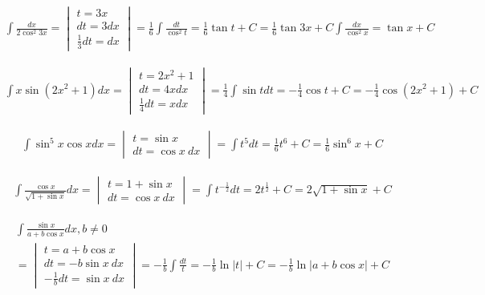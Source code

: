 
\begin{gather*}
  \int \frac{dx}{2\cos^2 3x} =
  \begin{vmatrix}
    t=3x \\
    dt=3dx \\
    \frac{1}{3}dt=dx
  \end{vmatrix}
  = \frac{1}{6} \int \frac{dt}{\cos^2 t}
  = \frac{1}{6} \tan t + C
  = \frac{1}{6}\tan 3x +C \int \frac{dx}{\cos^2x}
  = \tan x + C
\end{gather*}


\begin{gather*}
  \int x\sin(2x^2+1)dx =
  \begin{vmatrix}
    t=2x^2+1 \\
    dt=4xdx \\
    \frac{1}{4}dt=xdx
  \end{vmatrix}
  = \frac{1}{4}\int \sin{t} dt
  = -\frac{1}{4}\cos t + C
  = -\frac{1}{4}\cos (2x^2+1)+C
\end{gather*}


\begin{gather*}
  \int \sin^5x\cos{x} dx =
  \begin{vmatrix}
    t = \sin{x} \\
    dt=\cos x \ dx
  \end{vmatrix}
  = \int t^5dt
  = \frac{1}{6}t^6+C
  = \frac{1}{6}\sin^6x+C
\end{gather*}


\begin{gather*}
  \int \frac{\cos x}{\sqrt{1+\sin x}}dx =
  \begin{vmatrix}
    t=1+\sin x \\
    dt=\cos x \ dx
  \end{vmatrix}
  = \int t^{-\frac{1}{2}}dt
  = 2t^{\frac{1}{2}}+C
  = 2\sqrt{1+\sin x}+C
\end{gather*}


\begin{gather*}
  \int \frac{\sin x}{a+b\cos x}dx, b\neq 0 \\
  = \begin{vmatrix}
    t=a+b\cos x \\
    dt=-b\sin x \ dx \\
    -\frac{1}{b}dt=\sin x \ dx
  \end{vmatrix}
  = -\frac{1}{b} \int \frac{dt}{t}
  = -\frac{1}{b}\ln|t|+C
  = -\frac{1}{b}\ln|a+b\cos x|+C
\end{gather*}

